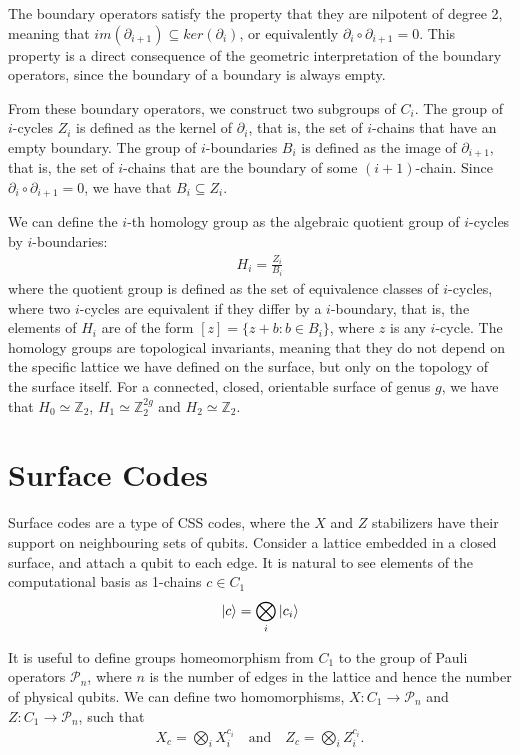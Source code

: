 \documentclass[12pt, twoside, openany]{book}
\begin{document}
The boundary operators satisfy the property that they are nilpotent of degree 2, meaning that $im(\partial_{i+1}) \subseteq ker(\partial_i)$, or equivalently $\partial_i \circ \partial_{i+1} = 0$. This property is a direct consequence of the geometric interpretation of the boundary operators, since the boundary of a boundary is always empty. 

From these boundary operators, we construct two subgroups of $C_i$. The group of $i$-cycles $Z_i$ is defined as the kernel of $\partial_i$, that is, the set of $i$-chains that have an empty boundary. The group of $i$-boundaries $B_i$ is defined as the image of $\partial_{i+1}$, that is, the set of $i$-chains that are the boundary of some $(i+1)$-chain. Since $\partial_i \circ \partial_{i+1} = 0$, we have that $B_i \subseteq Z_i$. 

We can define the $i$-th homology group as the algebraic quotient group of $i$-cycles by $i$-boundaries:
\begin{align}
    H_i = \frac{Z_i}{B_i}
\end{align}
where the quotient group is defined as the set of equivalence classes of $i$-cycles, where two $i$-cycles are equivalent if they differ by a $i$-boundary, that is, the elements of $H_i$ are of the form $[z] = \{ z + b : b \in B_i \}$, where $z$ is any $i$-cycle. The homology groups are topological invariants, meaning that they do not depend on the specific lattice we have defined on the surface, but only on the topology of the surface itself. For a connected, closed, orientable surface of genus $g$, we have that $H_0 \simeq \mathbb{Z}_2$, $H_1 \simeq \mathbb{Z}_2^{2g}$ and $H_2 \simeq \mathbb{Z}_2$. 



\section{Surface Codes}

Surface codes are a type of CSS codes, where the $X$ and $Z$ stabilizers have their support on neighbouring sets of qubits. Consider a lattice embedded in a closed surface, and attach a qubit to each edge. It is natural to see elements of the computational basis as 1-chains $c \in C_1$
\begin{align}
    \ket{c} = \bigotimes_i \ket{c_i} 
\end{align}

It is useful to define groups homeomorphism from $C_1$ to the group of Pauli operators $\mathcal{P}_n$, where $n$ is the number of edges in the lattice and hence the number of physical qubits. We can define two homomorphisms, $X: C_1 \rightarrow \mathcal{P}_n$ and $Z: C_1 \rightarrow \mathcal{P}_n$, such that 
\begin{align}
    X_c = \bigotimes_i X^{c_i}_i \quad \text{and} \quad Z_c = \bigotimes_i Z^{c_i}_i.
\end{align}
\end{document}
